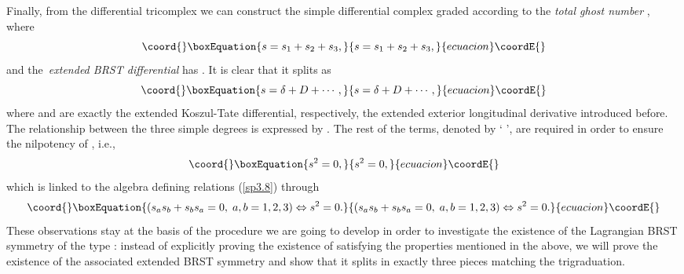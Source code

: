 \documentclass[a4paper,12pt]{article}
\begin{document}
Finally, from the \coordHE{} differential tricomplex \coordHE{} we can construct the simple differential complex \coordHE{} graded according to the \textit{total ghost
number} \coordHE{},
where 
\begin{equation}\coord{}\boxEquation{
s=s_{1}+s_{2}+s_{3},  \label{sp3.j}
}{
s=s_{1}+s_{2}+s_{3},  }{ecuacion}\coordE{}\end{equation}
and the\textit{\ extended BRST differential} \coordHE{} has \coordHE{}. It is clear that it splits as 
\begin{equation}\coord{}\boxEquation{
s=\delta +D+\cdots ,  \label{sp3.k}
}{
s=\delta +D+\cdots ,  }{ecuacion}\coordE{}\end{equation}
where \myHighlight{$\delta $}\coordHE{} and \coordHE{} are exactly the extended Koszul-Tate differential,
respectively, the extended exterior longitudinal derivative introduced
before. The relationship between the three simple degrees is expressed by \coordHE{}. The rest of the terms, denoted by `\myHighlight{$\cdots $}\coordHE{}%
', are required in order to ensure the nilpotency of \coordHE{}, i.e., 
\begin{equation}\coord{}\boxEquation{
s^{2}=0,  \label{sp3.l}
}{
s^{2}=0,  }{ecuacion}\coordE{}\end{equation}
which is linked to the \coordHE{} algebra defining relations (\ref{sp3.8})
through 
\begin{equation}\coord{}\boxEquation{
\left( s_{a}s_{b}+s_{b}s_{a}=0,\;a,b=1,2,3\right) \Leftrightarrow s^{2}=0.
\label{sp3.m}
}{
\left( s_{a}s_{b}+s_{b}s_{a}=0,\;a,b=1,2,3\right) \Leftrightarrow s^{2}=0.
}{ecuacion}\coordE{}\end{equation}
These observations stay at the basis of the procedure we are going to
develop in order to investigate the existence of the Lagrangian BRST
symmetry of the type \coordHE{}: instead of explicitly proving the existence of 
\coordHE{} satisfying the properties mentioned in the
above, we will prove the existence of the associated extended BRST symmetry
and show that it splits in exactly three pieces matching the trigraduation.
\end{document}
